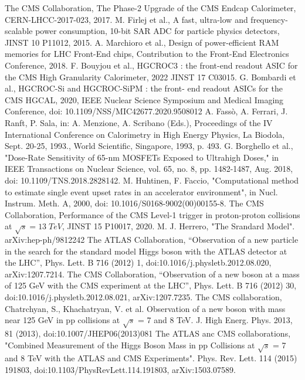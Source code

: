 \begin{thebibliography}{1}

The CMS Collaboration, The Phase-2 Upgrade of the CMS Endcap
Calorimeter, CERN-LHCC-2017-023, 2017.
M. Firlej et al., A fast, ultra-low and frequency-scalable power consumption, 10-bit SAR ADC for particle physics detectors, JINST 10 P11012, 2015.
A. Marchioro et al., Design of power-efficient RAM memories for LHC Front-End chips, Contribution to the Front-End Electronics Conference, 2018.
F. Bouyjou et al., HGCROC3 : the front-end readout ASIC for the CMS High Granularity Calorimeter, 2022 JINST 17 C03015.
G. Bombardi et al., HGCROC-Si and HGCROC-SiPM : the front- end readout ASICs for the CMS HGCAL, 2020, IEEE Nuclear Science Symposium and Medical Imaging Conference, doi: 10.1109/NSS/MIC42677.2020.9508012
A. Fassò, A. Ferrari, J. Ranft, P. Sala, in: A. Menzione, A. Scribano (Eds.), Proceedings of the IV International Conference on Calorimetry in High Energy Physics, La Biodola, Sept. 20-25, 1993., World Scientific, Singapore, 1993, p. 493.
G. Borghello et al., "Dose-Rate Sensitivity of 65-nm MOSFETs Exposed to Ultrahigh Doses," in IEEE Transactions on Nuclear Science, vol. 65, no. 8, pp. 1482-1487, Aug. 2018, doi: 10.1109/TNS.2018.2828142. %
M. Huhtinen, F. Faccio, "Computational method to estimate single event upset rates in an accelerator environment", in Nucl. Instrum. Meth. A, 2000, doi: 10.1016/S0168-9002(00)00155-8.
The CMS Collaboration, Performance of the CMS Level-1 trigger in proton-proton collisions at $\sqrt{s}=13\;TeV$, JINST 15 P10017, 2020.
M. J. Herrero, "The Srandard Model". arXiv:hep-ph/9812242
The ATLAS Collaboration, “Observation of a new particle in the search for the standard model Higgs boson with the ATLAS detector at the LHC”, Phys. Lett. B 716 (2012) 1, doi:10.1016/j.physletb.2012.08.020, arXiv:1207.7214.
The CMS Collaboration, “Observation of a new boson at a mass of 125 GeV with the CMS experiment at the LHC”, Phys. Lett. B 716 (2012) 30, doi:10.1016/j.physletb.2012.08.021, arXiv:1207.7235.
The CMS collaboration, Chatrchyan, S., Khachatryan, V. et al. Observation of a new boson with mass near 125 GeV in pp collisions at $\sqrt{s}$ = 7 and 8 TeV. J. High Energ. Phys. 2013, 81 (2013), doi:10.1007/JHEP06(2013)081
The ATLAS anc CMS collaborations, "Combined Measurement of the Higgs Boson Mass in pp Collisions at $\sqrt{s}$ = 7 and 8 TeV with the ATLAS and CMS Experiments". Phys. Rev. Lett. 114 (2015) 191803, doi:10.1103/PhysRevLett.114.191803, arXiv:1503.07589.

\end{thebibliography}
